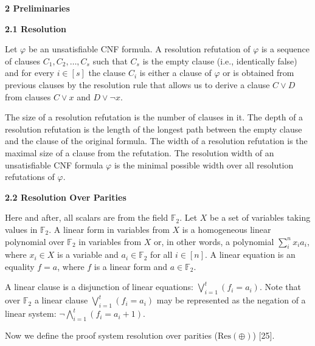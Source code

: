 \documentclass[10pt,a4paper]{article}
\begin{document}
\par\medskip\noindent\textbf{
2 Preliminaries}\par

\par\medskip\noindent\textbf{
2.1 Resolution}\par


Let $\varphi$ be an unsatisfiable CNF formula. A resolution refutation of $\varphi$ is a sequence of clauses $C_{1},C_{2},\dots,C_{s}$ such that $C_{s}$ is the empty clause (i.e., identically false) and for every $i\in[s]$ the clause $C_{i}$ is either a clause of $\varphi$ or is obtained from previous clauses by the resolution rule that allows us to derive a clause $C\lor D$ from clauses $C\lor x$ and $D\lor\lnot x$.\par



The size of a resolution refutation is the number of clauses in it.
The depth of a resolution refutation is the length of the longest path between the empty clause and the clause of the original formula.
The width of a resolution refutation is the maximal size of a clause from the refutation.
The resolution width of an unsatisfiable CNF formula $\varphi$ is the minimal possible width
over all resolution refutations of $\varphi$.\par


\par\medskip\noindent\textbf{
2.2 Resolution Over Parities}\par


Here and after, all scalars are from the field $\mathbb{F}_{2}$.
Let $X$ be a set of variables taking values in $\mathbb{F}_{2}$.
A linear form in variables from $X$ is a homogeneous linear polynomial over $\mathbb{F}_{2}$ in variables from $X$ or,
in other words, a polynomial $\sum_{i}^{n}x_{i}a_{i}$, where $x_{i}\in X$ is a variable and $a_{i}\in\mathbb{F}_{2}$ for all $i\in[n]$.
A linear equation is an equality $f=a$, where $f$ is a linear form and $a\in\mathbb{F}_{2}$.\par



A linear clause is a disjunction of linear equations: $\bigvee_{i=1}^{t}(f_{i}=a_{i})$.
Note that over $\mathbb{F}_{2}$ a linear clause $\bigvee_{i=1}^{t}(f_{i}=a_{i})$ may be represented
as the negation of a linear system: $\lnot\bigwedge_{i=1}^{t}(f_{i}=a_{i}+1)$.\par



Now we define the proof system resolution over parities ($\mathrm{Res}(\oplus)$) [25].\par
\end{document}
